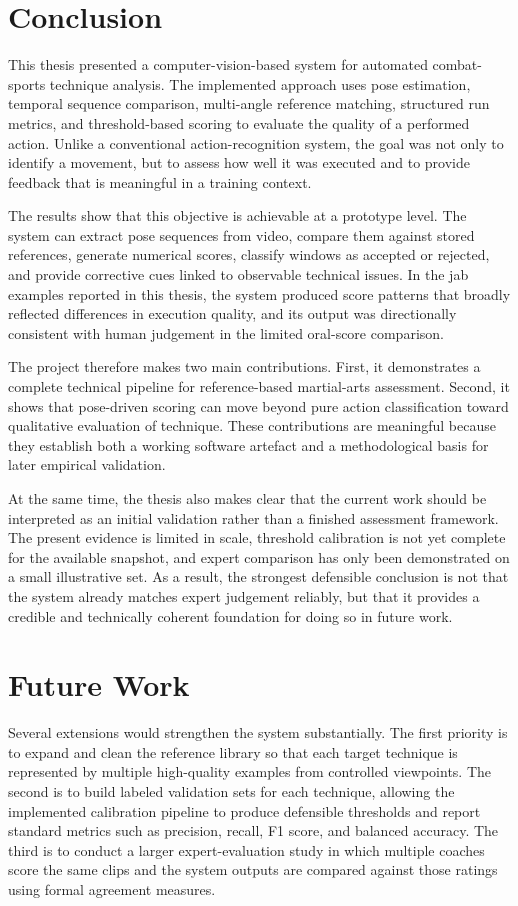 \documentclass[12pt]{article}
\begin{document}
\section{Conclusion}

This thesis presented a computer-vision-based system for automated combat-sports technique analysis. The implemented approach uses pose estimation, temporal sequence comparison, multi-angle reference matching, structured run metrics, and threshold-based scoring to evaluate the quality of a performed action. Unlike a conventional action-recognition system, the goal was not only to identify a movement, but to assess how well it was executed and to provide feedback that is meaningful in a training context.

The results show that this objective is achievable at a prototype level. The system can extract pose sequences from video, compare them against stored references, generate numerical scores, classify windows as accepted or rejected, and provide corrective cues linked to observable technical issues. In the jab examples reported in this thesis, the system produced score patterns that broadly reflected differences in execution quality, and its output was directionally consistent with human judgement in the limited oral-score comparison.

The project therefore makes two main contributions. First, it demonstrates a complete technical pipeline for reference-based martial-arts assessment. Second, it shows that pose-driven scoring can move beyond pure action classification toward qualitative evaluation of technique. These contributions are meaningful because they establish both a working software artefact and a methodological basis for later empirical validation.

At the same time, the thesis also makes clear that the current work should be interpreted as an initial validation rather than a finished assessment framework. The present evidence is limited in scale, threshold calibration is not yet complete for the available snapshot, and expert comparison has only been demonstrated on a small illustrative set. As a result, the strongest defensible conclusion is not that the system already matches expert judgement reliably, but that it provides a credible and technically coherent foundation for doing so in future work.

\section{Future Work}
Several extensions would strengthen the system substantially. The first priority is to expand and clean the reference library so that each target technique is represented by multiple high-quality examples from controlled viewpoints. The second is to build labeled validation sets for each technique, allowing the implemented calibration pipeline to produce defensible thresholds and report standard metrics such as precision, recall, F1 score, and balanced accuracy. The third is to conduct a larger expert-evaluation study in which multiple coaches score the same clips and the system outputs are compared against those ratings using formal agreement measures.
\end{document}
